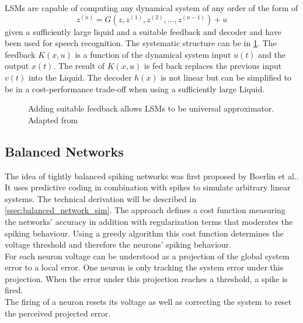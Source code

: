 \acp{LSM} are capable of computing any dynamical system of any order of the form of
\begin{equation}
	z^{(n)} = G(z,z^{(1)},z^{(2)},\dots,z^{(n-1)}) + u
\end{equation}
given a sufficiently large liquid and a suitable feedback and decoder\cite{maass_computational_2004} and have been used for speech recognition\cite{jin_performance_2017}\cite{zhang_digital_2015}. The systematic structure can be in \cref{fig:LSM_feedback}. The feedback $K(x,u)$ is a function of the dynamical system input $u(t)$ and the output $x(t)$. The result of $K(x,u)$ is fed back replaces the previous input $v(t)$ into the Liquid. The decoder $h(x)$ is not linear but can be simplified to be in a cost-performance trade-off when using a sufficiently large Liquid.\\
\begin{figure}[htbp]
	\centering
	
	\caption{Adding suitable feedback allows \acp{LSM} to be universal approximator. Adapted from \cite{maass_computational_2007}}
	\label{fig:LSM_feedback}
\end{figure}

\subsection{Balanced Networks}
The idea of tightly balanced spiking networks was first proposed by Boerlin et al.\cite{boerlin_predictive_2013}. It uses predictive coding in combination with spikes to simulate arbitrary linear systems.
The technical derivation will be described in \cref{ssec:balanced_network_sim}. The approach defines a cost function measuring the networks' accuracy in addition with regularization terms that moderates the spiking behaviour. Using a greedy algorithm this cost function determines the voltage threshold and therefore the neurons' spiking behaviour.\\
For each neuron voltage can be understood as a projection of the global system error to a local error. One neuron is only tracking the system error under this projection. When the error under this projection reaches a threshold, a spike is fired.\\
The firing of a neuron resets its voltage as well as correcting the system to reset the perceived projected error.\\


